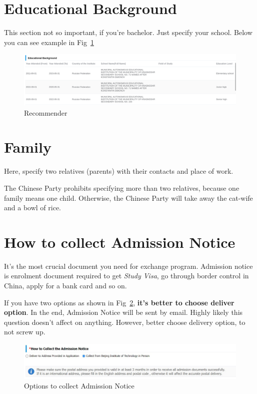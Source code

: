 \section{Educational Background}\label{sec:ru_edu}

This section not so important, if you're bachelor.
Just specify your school.
Below you can see example in Fig~\ref{fig:ru_edu_back}


\begin{figure}[H]
    \centering
    \includegraphics[width=\textwidth]{russia/imgs/app_edu_back}
    \caption{\centering Recommender}
    \label{fig:ru_edu_back}
\end{figure}







\section{Family}\label{sec:ru_family}
Here, specify two relatives (parents)
with their contacts and place of work.


\begin{joke}
The Chinese Party prohibits specifying more than two relatives,
because one family means one child.
Otherwise, the Chinese Party will take away the
cat-wife and a bowl of rice.
\end{joke}





\section{How to collect Admission Notice}\label{sec:ru_adm_not_delivery}

It's the most crucial document you need for exchange program.
Admission notice is enrolment document required to get \textit{Study Visa},
go through border control in China, apply for a bank card and so on.

If you have two options as shown in Fig~\ref{fig:ru_collect_adm_not},
\textbf{it's better to choose deliver option}.
In the end, Admission Notice will be sent by email.
Highly likely this question doesn't affect on anything.
However, better choose delivery option, to not screw up.


\begin{figure}[H]
    \centering
    \includegraphics[width=\textwidth]{russia/imgs/app_adm_notice}
    \caption{\centering Options to collect Admission Notice}
    \label{fig:ru_collect_adm_not}
\end{figure}
